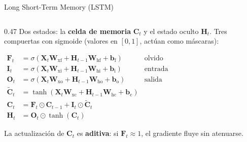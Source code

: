 \documentclass[aspectratio=169, 10pt]{beamer}
\newcommand{\W}[1]{\mathbf{W}_{\textrm{#1}}}
\newcommand{\bvec}[1]{\mathbf{b}_{\textrm{#1}}}
\newcommand{\formula}[1]{%
	\begin{tcolorbox}[colback=UCMBlue!8, colframe=UCMBlue, arc=4pt,
		boxsep=2pt, left=6pt, right=6pt, top=3pt, bottom=3pt]
		#1
	\end{tcolorbox}
}
\begin{document}
\begin{frame}{Long Short-Term Memory (LSTM)}
\begin{columns}[c]
		\begin{column}{0.47\textwidth}
			\small
			Dos estados: la \textbf{celda de memoria} $\mathbf{C}_t$ y el estado oculto $\mathbf{H}_t$. Tres compuertas con sigmoide (valores en $[0,1]$, act\'uan como m\'ascaras):
			\formula{\scriptsize
				$\begin{aligned}
						\mathbf{F}_t       & = \sigma(\mathbf{X}_t\W{xf} + \mathbf{H}_{t-1}\W{hf} + \bvec{f}) & \text{olvido} \\
						\mathbf{I}_t       & = \sigma(\mathbf{X}_t\W{xi} + \mathbf{H}_{t-1}\W{hi} + \bvec{i}) & \text{entrada} \\
						\mathbf{O}_t       & = \sigma(\mathbf{X}_t\W{xo} + \mathbf{H}_{t-1}\W{ho} + \bvec{o}) & \text{salida} \\
						\tilde{\mathbf{C}}_t & = \tanh(\mathbf{X}_t\W{xc} + \mathbf{H}_{t-1}\W{hc} + \bvec{c}) &               \\
						\mathbf{C}_t       & = \mathbf{F}_t\odot\mathbf{C}_{t-1} + \mathbf{I}_t\odot\tilde{\mathbf{C}}_t &  \\
						\mathbf{H}_t       & = \mathbf{O}_t\odot\tanh(\mathbf{C}_t) &
					\end{aligned}$}
			La actualizaci\'on de $\mathbf{C}_t$ es \textbf{aditiva}: si $\mathbf{F}_t\approx 1$, el gradiente fluye sin atenuarse.
		\end{column}
	\end{columns}

\end{frame}
\end{document}
